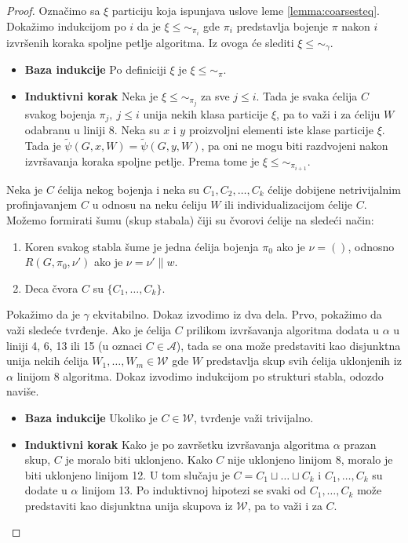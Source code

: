 \documentclass[12pt,oneside]{memoir}
\theoremstyle{definition}
\begin{document}
  \begin{proof}

	  Označimo sa $\xi$ particiju koja ispunjava uslove leme
	  \ref{lemma:coarsesteq}. Dokažimo indukcijom po $i$ da je $\xi \leq
	  \sim_{\pi_i}$ gde $\pi_i$ predstavlja bojenje $\pi$ nakon $i$ izvršenih
	  koraka spoljne petlje algoritma. Iz ovoga će slediti $\xi \leq \sim_\gamma$.

	  \begin{itemize}
		  \item[] \textbf{Baza indukcije} Po definiciji $\xi$ je $\xi \leq \sim_{\pi}$.
		  \item[] \textbf{Induktivni korak} Neka je $\xi \leq \sim_{\pi_j}$ za sve $ j \leq i$.
			  Tada je svaka ćelija $C$ svakog bojenja $\pi_j,\ j \leq i$ unija nekih
			  klasa particije $\xi$, pa to važi i za ćeliju $W$ odabranu u
			  liniji 8.  Neka su $x$ i $y$ proizvoljni elementi iste klase
			  particije $\xi$. Tada je $\widetilde{\psi}(G, x, W) = \widetilde{\psi}(G, y, W)$, pa oni ne
			  mogu biti razdvojeni nakon izvršavanja koraka spoljne petlje.
			  Prema tome je $\xi \leq \sim_{\pi_{i+1}}$.
	  \end{itemize}

	  Neka je $C$ ćelija nekog bojenja i neka su $C_1, C_2, \dots, C_k$ ćelije
	  dobijene netrivijalnim profinjavanjem $C$ u odnosu na neku ćeliju $W$ ili
	  individualizacijom ćelije $C$. Možemo formirati šumu (skup stabala) čiji
	  su čvorovi ćelije na sledeći način:
	  \begin{enumerate}
		  \item Koren svakog stabla šume je jedna ćelija bojenja $\pi_0$ ako je
			  $\nu = ()$, odnosno $R(G, \pi_0, \nu')$ ako je $\nu = \nu' \| w$.
		  \item Deca čvora $C$ su $\{C_1, \dots, C_k\}$.
	  \end{enumerate}

	  Pokažimo da je $\gamma$ ekvitabilno. Dokaz izvodimo iz dva dela. Prvo,
	  pokažimo da važi sledeće tvrđenje. Ako je ćelija $C$ prilikom izvršavanja
	  algoritma dodata u $\alpha$ u liniji 4, 6, 13 ili 15 (u oznaci $C \in
	  \mathcal{A}$), tada se ona može predstaviti kao disjunktna unija nekih ćelija
	  $W_1, \dots, W_m \in \mathcal{W}$ gde $W$ predstavlja skup svih ćelija
	  uklonjenih iz $\alpha$ linijom 8 algoritma.  Dokaz izvodimo indukcijom po
	  strukturi stabla, odozdo naviše.

	  \begin{itemize}
		  \item[] \textbf{Baza indukcije} Ukoliko je $C \in \mathcal{W}$,
			  tvrđenje važi trivijalno.
		  \item[] \textbf{Induktivni korak} Kako je po završetku izvršavanja
			  algoritma $\alpha$ prazan skup, $C$ je moralo biti uklonjeno.
			  Kako $C$ nije uklonjeno linijom 8, moralo je biti uklonjeno
			  linijom 12. U tom slučaju je $C = C_1 \sqcup \dots \sqcup C_k$ i
			  $C_1, \dots, C_k$ su dodate u $\alpha$ linijom 13. Po induktivnoj
			  hipotezi se svaki od $C_1, \dots, C_k$ može predstaviti kao
			  disjunktna unija skupova iz $\mathcal{W}$, pa to važi i za $C$.
	  \end{itemize}


\end{proof}
\end{document}
